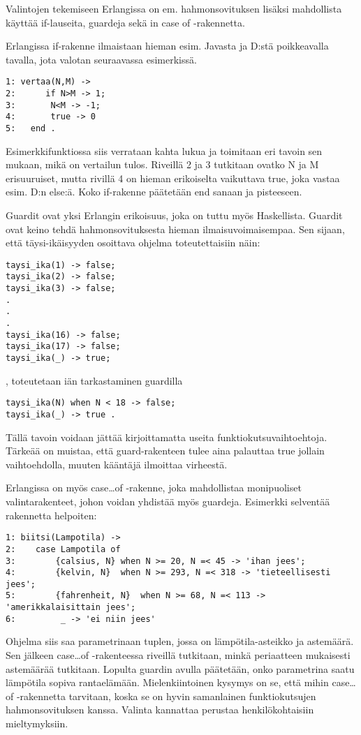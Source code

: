 \documentclass[11pt,oneside,a4paper]{article}
\begin{document}
Valintojen tekemiseen Erlangissa on em. hahmonsovituksen lisäksi mahdollista käyttää if-lauseita, guardeja sekä in case of -rakennetta.

Erlangissa if-rakenne ilmaistaan hieman esim. Javasta ja D:stä poikkeavalla tavalla, jota valotan seuraavassa esimerkissä. 

\begin{verbatim}
1: vertaa(N,M) -> 
2: 		if N>M -> 1;
3:	     N<M -> -1;
4:	     true -> 0
5: 	 end . 
\end{verbatim}

Esimerkkifunktiossa siis verrataan kahta lukua ja toimitaan eri tavoin sen mukaan, mikä on vertailun tulos. Riveillä 2 ja 3 tutkitaan ovatko N ja M erisuuruiset, mutta rivillä 4 on hieman erikoiselta
vaikuttava true, joka vastaa esim. D:n else:ä. Koko if-rakenne päätetään end sanaan ja pisteeseen. 

Guardit ovat yksi Erlangin erikoisuus, joka on tuttu myös Haskellista. Guardit ovat keino tehdä hahmonsovituksesta hieman ilmaisuvoimaisempaa. Sen sijaan, että täysi-ikäisyyden osoittava ohjelma 
toteutettaisiin näin: 
\begin{verbatim}
taysi_ika(1) -> false;
taysi_ika(2) -> false;
taysi_ika(3) -> false;
.
.
.
taysi_ika(16) -> false;
taysi_ika(17) -> false;
taysi_ika(_) -> true;
\end{verbatim}
, toteutetaan iän tarkastaminen guardilla
\begin{verbatim}
taysi_ika(N) when N < 18 -> false;
taysi_ika(_) -> true . 
\end{verbatim}

Tällä tavoin voidaan jättää kirjoittamatta useita funktiokutsuvaihtoehtoja.  Tärkeää on muistaa, että guard-rakenteen tulee aina palauttaa true jollain vaihtoehdolla, muuten kääntäjä ilmoittaa virheestä.  

Erlangissa on myös case…of -rakenne, joka mahdollistaa monipuoliset valintarakenteet, johon voidan yhdistää myös guardeja. Esimerkki selventää rakennetta helpoiten:
\begin{verbatim}
1: biitsi(Lampotila) -> 
2:    case Lampotila of
3:        {calsius, N} when N >= 20, N =< 45 -> 'ihan jees';
4:        {kelvin, N}  when N >= 293, N =< 318 -> 'tieteellisesti jees';  
5:        {fahrenheit, N}  when N >= 68, N =< 113 -> 'amerikkalaisittain jees'; 
6:         _ -> 'ei niin jees' 
\end{verbatim}

Ohjelma siis saa parametrinaan tuplen, jossa on lämpötila-asteikko ja astemäärä. Sen jälkeen case…of -rakenteessa riveillä  tutkitaan, minkä periaatteen mukaisesti astemäärää tutkitaan. Lopulta guardin avulla päätetään, onko parametrina 
saatu lämpötila sopiva rantaelämään. Mielenkiintoinen kysymys on se, että mihin case…of -rakennetta tarvitaan, koska se on hyvin samanlainen funktiokutsujen hahmonsovituksen kanssa. Valinta kannattaa perustaa henkilökohtaisiin mieltymyksiin. 
\end{document}
